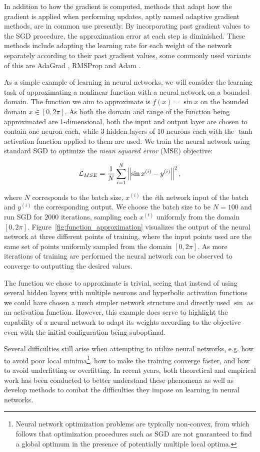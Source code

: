 In addition to how the gradient is computed, methods that adapt how the gradient is applied when performing updates, aptly named adaptive gradient methods, are in common use presently. By incorporating past gradient values to the SGD procedure, the approximation error at each step is diminished. These methods include adapting the learning rate for each weight of the network separately according to their past gradient values, some commonly used variants of this are AdaGrad \cite{adagrad}, RMSProp \cite{rmsprop} and Adam \cite{rmsprop}.

As a simple example of learning in neural networks, we will consider the learning task of approximating a nonlinear function with a neural network on a bounded domain. The function we aim to approximate is $f(x) = \sin x$ on the bounded domain $x \in [0, 2\pi]$. As both the domain and range of the function being approximated are 1-dimensional, both the input and output layer are chosen to contain one neuron each, while 3 hidden layers of 10 neurons each with the $\tanh$ activation function applied to them are used. We train the neural network using standard SGD to optimize the \textit{mean squared error} (MSE) objective:

$$\mathcal{L}_{MSE} = \frac{1}{N} \sum_{i=1}^{N} \left\lVert\sin x^{(i)} - y^{(i)}\right\rVert^2,$$

where $N$ corresponds to the batch size, $x^{(i)}$ the $i$th network input of the batch and $y^{(i)}$ the corresponding output. We choose the batch size to be $N=100$ and run SGD for $2000$ iterations, sampling each $x^{(i)}$ uniformly from the domain $[0, 2\pi]$. Figure~\ref{fig:function_approximation} visualizes the output of the neural network at three different points of training, where the input points used are the same set of points uniformly sampled from the domain $[0, 2\pi]$. As more iterations of training are performed the neural network can be observed to converge to outputting the desired values.

The function we chose to approximate is trivial, seeing that instead of using several hidden layers with multiple neurons and hyperbolic activation functions we could have chosen a much simpler network structure and directly used $\sin$ as an activation function. However, this example does serve to highlight the capability of a neural network to adapt its weights according to the objective even with the initial configuration being suboptimal.

Several difficulties still arise when attempting to utilize neural networks, e.g. how to avoid poor local minima\footnote{Neural network optimization problems are typically non-convex, from which follows that optimization procedures such as SGD are not guaranteed to find a global optimum in the presence of potentially multiple local optima.}, how to make the training converge faster, and how to avoid underfitting or overfitting. In recent years, both theoretical and empirical work has been conducted to better understand these phenomena as well as develop methods to combat the difficulties they impose on learning in neural networks. 

